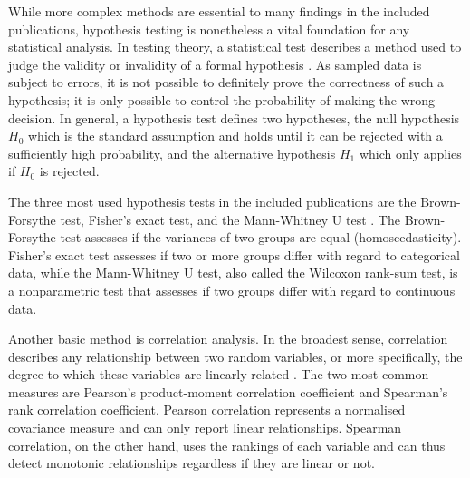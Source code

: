 \noindent While\label{mar:tests} more complex
methods are essential to many findings in the included publications,
hypothesis testing is nonetheless a vital foundation for any statistical
analysis. In testing theory, a statistical test describes a method used to
judge the validity or invalidity of a formal hypothesis \citep{Teunissen2006}.
As sampled data is subject to errors, it is not possible to definitely prove
the correctness of such a hypothesis; it is only possible to control the
probability of making the wrong decision. In general, a hypothesis test
defines two hypotheses, the null hypothesis $H_{0}$ which is the standard
assumption and holds until it can be rejected with a sufficiently high
probability, and the alternative hypothesis $H_{1}$ which only applies if
$H_{0}$ is rejected.

The three most used hypothesis tests in the included publications are the
Brown-Forsythe test, Fisher's exact test, and the Mann-Whitney U test
\citep{Fisher1922,Wilcoxon1945,Mann1947,Brown1974,Winters2010}. The
Brown-Forsythe test assesses if the variances of two groups are equal
(homoscedasticity). Fisher's exact test assesses if two or more groups differ
with regard to categorical data, while the Mann-Whitney U test, also called
the Wilcoxon rank-sum test, is a nonparametric test that assesses if two
groups differ with regard to continuous data.
\bigbreak

\noindent Another\label{mar:cor} basic method is
correlation analysis. In the broadest sense, correlation describes any
relationship between two random variables, or more specifically, the degree to
which these variables are linearly related \citep{Mann1947}. The two most
common measures are Pearson's product-moment correlation coefficient and
Spearman's rank correlation coefficient. Pearson correlation represents a
normalised covariance measure and can only report linear relationships.
Spearman correlation, on the other hand, uses the rankings of each variable
and can thus detect monotonic relationships regardless if they are linear or
not.
\bigbreak

